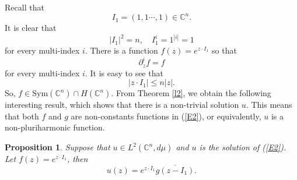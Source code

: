 \documentclass[11pt,reqno]{amsart}
\newtheorem{prop}[theorem]{Proposition}
\theoremstyle{definition}
\begin{document}
Recall that $$I_1=(1,1\cdots,1)\in \mathbb{C}^n.$$ It is clear that
$$|I_1|^2=n,\quad I_1^i=1^{|i|}=1$$  for every multi-index $i.$
There is a function $f(z)=e^{z\cdot I_1}$ so that
\begin{equation}\label{E9}
\partial^i_z f=f
\end{equation} for every multi-index $i.$ It is easy to see that
$$|z\cdot I_1|\leq n|z|.$$ So, $f\in \mathrm{Sym}(\mathbb{C}^n)\cap H(\mathbb{C}^n).$
From Theorem \ref{l2}, we obtain the following interesting result, which shows that there is a non-trivial solution $u$. This means that
both $f$ and $g$ are non-constants functions in (\ref{E2}), or equivalently, $u$ is a non-pluriharmonic function.
\begin{prop}\label{p2}
Suppose that $u\in L^{2}(\mathbb{C}^n,d\mu)$ and $u$ is the solution  of (\ref{E2}). Let $f(z)=e^{z\cdot I_1}$, then
$$u(z)=e^{z\cdot I_1}\overline{g(z-I_1)}.$$
\end{prop}
\end{document}

